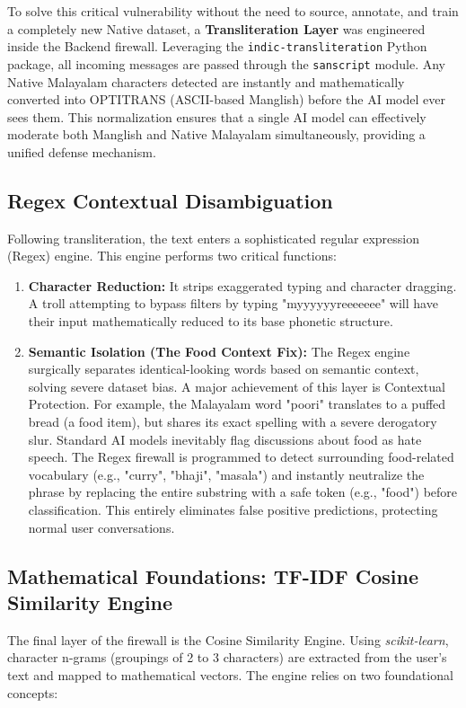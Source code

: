 \documentclass[12pt,a4paper]{report}
\begin{document}
To solve this critical vulnerability without the need to source, annotate, and train a completely new Native dataset, a \textbf{Transliteration Layer} was engineered inside the Backend firewall. Leveraging the \texttt{indic-transliteration} Python package, all incoming messages are passed through the \texttt{sanscript} module. Any Native Malayalam characters detected are instantly and mathematically converted into OPTITRANS (ASCII-based Manglish) before the AI model ever sees them. This normalization ensures that a single AI model can effectively moderate both Manglish and Native Malayalam simultaneously, providing a unified defense mechanism.

\subsection{Regex Contextual Disambiguation}
Following transliteration, the text enters a sophisticated regular expression (Regex) engine. This engine performs two critical functions:
\begin{enumerate}
    \item \textbf{Character Reduction:} It strips exaggerated typing and character dragging. A troll attempting to bypass filters by typing "myyyyyyreeeeeee" will have their input mathematically reduced to its base phonetic structure.
    \item \textbf{Semantic Isolation (The Food Context Fix):} The Regex engine surgically separates identical-looking words based on semantic context, solving severe dataset bias. A major achievement of this layer is Contextual Protection. For example, the Malayalam word "poori" translates to a puffed bread (a food item), but shares its exact spelling with a severe derogatory slur. Standard AI models inevitably flag discussions about food as hate speech. The Regex firewall is programmed to detect surrounding food-related vocabulary (e.g., "curry", "bhaji", "masala") and instantly neutralize the phrase by replacing the entire substring with a safe token (e.g., "food") before classification. This entirely eliminates false positive predictions, protecting normal user conversations.
\end{enumerate}

\subsection{Mathematical Foundations: TF-IDF Cosine Similarity Engine}
The final layer of the firewall is the Cosine Similarity Engine. Using \textit{scikit-learn}, character n-grams (groupings of 2 to 3 characters) are extracted from the user's text and mapped to mathematical vectors. The engine relies on two foundational concepts:
\end{document}

